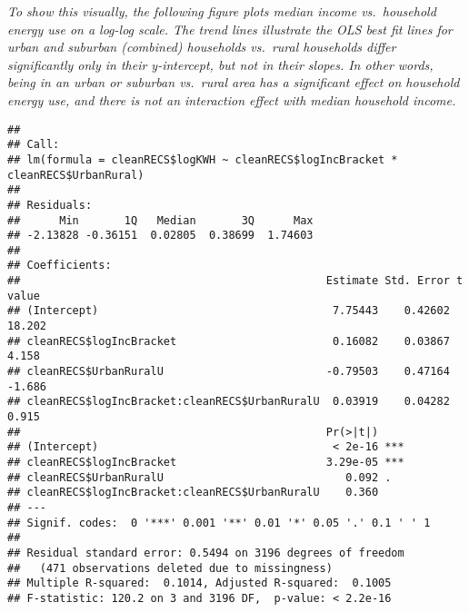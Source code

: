 \documentclass[
]{article}
\newenvironment{Shaded}{\begin{snugshade}}{\end{snugshade}}
\newcommand{\FunctionTok}[1]{\textcolor[rgb]{0.00,0.00,0.00}{#1}}
\newcommand{\NormalTok}[1]{#1}
\newcommand{\OtherTok}[1]{\textcolor[rgb]{0.56,0.35,0.01}{#1}}
\newcommand{\SpecialCharTok}[1]{\textcolor[rgb]{0.00,0.00,0.00}{#1}}
\begin{document}
\emph{To show this visually, the following figure plots median income
vs.~household energy use on a log-log scale. The trend lines illustrate
the OLS best fit lines for urban and suburban (combined) households
vs.~rural households differ significantly only in their y-intercept, but
not in their slopes. In other words, being in an urban or suburban
vs.~rural area has a significant effect on household energy use, and
there is not an interaction effect with median household income.}

\begin{Shaded}
\end{Shaded}

\begin{verbatim}
## 
## Call:
## lm(formula = cleanRECS$logKWH ~ cleanRECS$logIncBracket * cleanRECS$UrbanRural)
## 
## Residuals:
##      Min       1Q   Median       3Q      Max 
## -2.13828 -0.36151  0.02805  0.38699  1.74603 
## 
## Coefficients:
##                                               Estimate Std. Error t value
## (Intercept)                                    7.75443    0.42602  18.202
## cleanRECS$logIncBracket                        0.16082    0.03867   4.158
## cleanRECS$UrbanRuralU                         -0.79503    0.47164  -1.686
## cleanRECS$logIncBracket:cleanRECS$UrbanRuralU  0.03919    0.04282   0.915
##                                               Pr(>|t|)    
## (Intercept)                                    < 2e-16 ***
## cleanRECS$logIncBracket                       3.29e-05 ***
## cleanRECS$UrbanRuralU                            0.092 .  
## cleanRECS$logIncBracket:cleanRECS$UrbanRuralU    0.360    
## ---
## Signif. codes:  0 '***' 0.001 '**' 0.01 '*' 0.05 '.' 0.1 ' ' 1
## 
## Residual standard error: 0.5494 on 3196 degrees of freedom
##   (471 observations deleted due to missingness)
## Multiple R-squared:  0.1014, Adjusted R-squared:  0.1005 
## F-statistic: 120.2 on 3 and 3196 DF,  p-value: < 2.2e-16
\end{verbatim}
\end{document}
